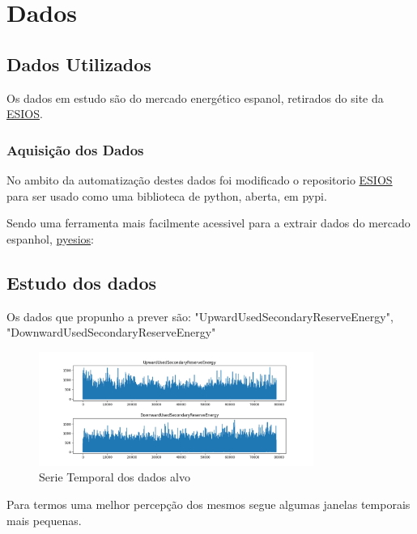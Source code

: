 \chapter{Dados}

\section{Dados Utilizados\label{se:dados_crus}}

Os dados em estudo são do mercado energético espanol, retirados do site da \href{https://www.esios.ree.es/es}{ESIOS}.




\subsection{Aquisição dos Dados}

No ambito da automatização destes dados foi modificado o repositorio \href{https://github.com/SanPen/ESIOS}{ESIOS} para ser usado como uma biblioteca de python, aberta, em pypi.

Sendo uma ferramenta mais facilmente acessivel para a extrair dados do mercado espanhol, \href{https://pypi.org/project/pyesios/}{pyesios}:



\section{Estudo dos dados \label{se:dados_estudo}}

Os dados que propunho a prever são: "UpwardUsedSecondaryReserveEnergy", "DownwardUsedSecondaryReserveEnergy"

\begin{figure}[H]
  \centering
  \includegraphics[width=0.8\textwidth]{../plots/targets_timeseries.png}
  \caption{Serie Temporal dos dados alvo}
  \label{fig:target_timeseries}
\end{figure}

Para termos uma melhor percepção dos mesmos segue algumas janelas temporais mais pequenas.

